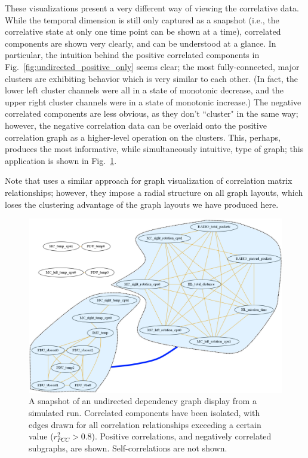 These visualizations present a very different way of viewing the correlative data. While the temporal dimension is still only captured as a snapshot (i.e., the correlative state at only one time point can be shown at a time), correlated components are shown very clearly, and can be understood at a glance. In particular, the intuition behind the positive correlated components in Fig.~\ref{fig:undirected_positive_only} seems clear; the most fully-connected, major clusters are exhibiting behavior which is very similar to each other. (In fact, the lower left cluster channels were all in a state of monotonic decrease, and the upper right cluster channels were in a state of monotonic increase.) The negative correlated components are less obvious, as they don't ``cluster" in the same way; however, the negative correlation data can be overlaid onto the positive correlation graph as a higher-level operation on the clusters. This, perhaps, produces the most informative, while simultaneously intuitive, type of graph; this application is shown in Fig.~\ref{fig:undirected_positive_with_negative_clusters}.

Note that \cite{yeh2007exploratory} uses a similar approach for graph visualization of correlation matrix relationships; however, they impose a radial structure on all graph layouts, which loses the clustering advantage of the graph layouts we have produced here.

\begin{figure}[h]
\centering
    \includegraphics[width=\columnwidth]{images/undirected_positive_with_negative_clusters.png}
    \caption{A snapshot of an undirected dependency graph display from a simulated run. Correlated components have been isolated, with edges drawn for all correlation relationships exceeding a certain value ($r_{PCC}^{2} > 0.8$). Positive correlations, and negatively correlated subgraphs, are shown. Self-correlations are not shown.}
    \label{fig:undirected_positive_with_negative_clusters}
\end{figure}

